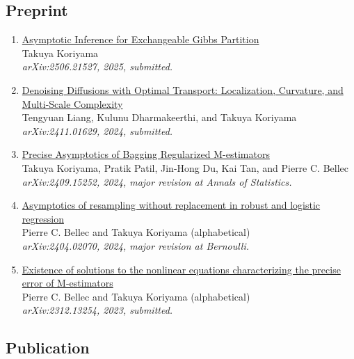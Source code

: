 \documentclass[10pt]{amsart}
\begin{document}
\subsection*{Preprint}
\begin{enumerate}
\item \href{https://arxiv.org/abs/2506.21527}{Asymptotic Inference for Exchangeable Gibbs Partition}\\
Takuya Koriyama\\
\textit{arXiv:2506.21527, 2025, submitted.}

\item \href{https://arxiv.org/abs/2411.01629}{Denoising Diffusions with Optimal Transport: Localization, Curvature, and Multi-Scale Complexity}\\
Tengyuan Liang, Kulunu Dharmakeerthi, and Takuya Koriyama \\
\textit{arXiv:2411.01629, 2024, submitted.}

\item \href{https://arxiv.org/abs/2409.15252}{Precise Asymptotics of Bagging Regularized M-estimators}\\
Takuya Koriyama, Pratik Patil, Jin-Hong Du, Kai Tan, and Pierre C. Bellec \\
\textit{arXiv:2409.15252, 2024, major revision at Annals of Statistics.}

\item \href{https://arxiv.org/abs/2404.02070}{Asymptotics of resampling without replacement in robust and logistic regression}\\
Pierre C. Bellec and Takuya Koriyama (alphabetical)\\
\textit{arXiv:2404.02070, 2024, major revision at Bernoulli.}

\item \href{https://arxiv.org/abs/2312.13254}{Existence of solutions to the nonlinear equations characterizing the precise error of M-estimators}\\
Pierre C. Bellec and Takuya Koriyama (alphabetical)\\
\textit{arXiv:2312.13254, 2023, submitted.}
\end{enumerate}

\subsection*{Publication}
\end{document}
